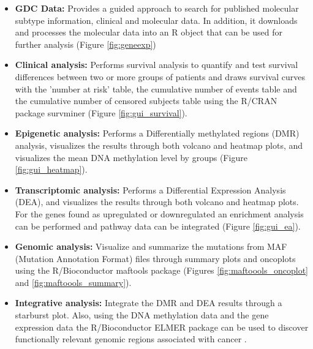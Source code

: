 \begin{itemize}
\item \textbf{GDC Data:} Provides a guided approach to search for published molecular subtype information, clinical and molecular data. In addition, it downloads and processes the molecular data into an R object that can be used for further analysis (Figure \ref{fig:geneexp})
\item \textbf{Clinical analysis:} Performs survival analysis to quantify and test survival differences between two or more groups of patients and draws survival curves with the 'number at risk' table, the cumulative number of events table and the cumulative number of censored subjects table using the R/CRAN package survminer \cite{survminer} (Figure \ref{fig:gui_survival}).
\item \textbf{Epigenetic analysis:} Performs a Differentially methylated regions (DMR) analysis, visualizes the results through both volcano and heatmap plots, and visualizes the mean DNA methylation level by groups (Figure \ref{fig:gui_heatmap}).
\item \textbf{Transcriptomic analysis:} Performs a Differential Expression Analysis (DEA), and visualizes the results through both volcano and heatmap plots. For the genes found as upregulated or downregulated an enrichment analysis can be performed and pathway data can be integrated \cite{luo2013pathview} (Figure \ref{fig:gui_ea}).
\item \textbf{Genomic analysis:} Visualize and summarize the mutations from MAF (Mutation Annotation Format) files through summary plots and oncoplots using the R/Bioconductor maftools package \cite{Gu20052016,Maftools}
(Figures \ref{fig:maftoools_oncoplot} and \ref{fig:maftoools_summary}).
\item \textbf{Integrative analysis:} Integrate the DMR and DEA results through a starburst plot. Also, using the DNA methylation data and the gene expression data the R/Bioconductor ELMER package can be used to discover functionally relevant genomic regions associated with cancer \cite{yao2015inferring, ELMER2}.
\end{itemize}


